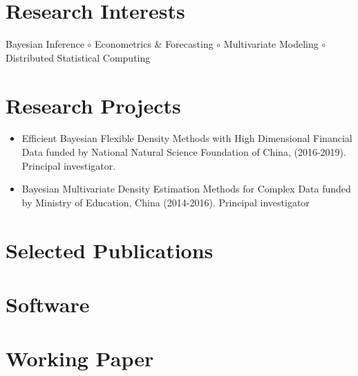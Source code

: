 \documentclass[twoside,a4paper,11pt]{amsart}
\begin{document}
\section*{Research Interests}

Bayesian Inference $\circ$ Econometrics \& Forecasting $\circ$ Multivariate
Modeling $\circ$ Distributed Statistical Computing


\section*{Research Projects}
\begin{itemize}
\item Efficient Bayesian Flexible Density Methods with High Dimensional Financial Data
  funded by National Natural Science Foundation of China, (2016-2019). Principal investigator.

\item Bayesian Multivariate Density Estimation Methods for Complex Data funded by Ministry
  of Education, China (2014-2016). Principal investigator

\end{itemize}

\section*{Selected Publications}

\nocite{hao2020bilinear}
\nocite{kang2019gratis}
\nocite{bailey2019changes}
\nocite{li2019credit}
\nocite{li2018improving}
\nocite{pino2018cohort}
\nocite{li2016distributed}
\nocite{li2013bayesian}
\nocite{li2013efficient}
\nocite{li2011modeling}
\nocite{li2010flexible}

\printbibliography[heading=none,  nottype=software]

\section*{Software}
\nocite{gratis}
\nocite{spark-dlsa}

% 
% 

\section*{Working Paper}
\end{document}
